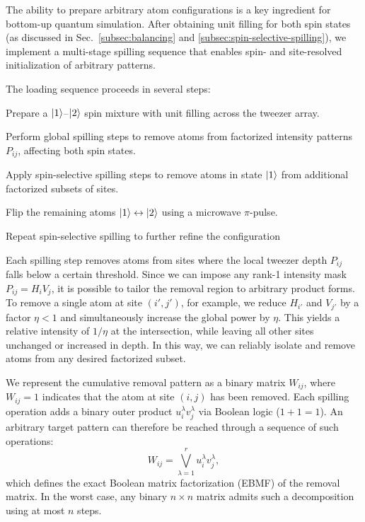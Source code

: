 
The ability to prepare arbitrary atom configurations is a key ingredient for bottom-up quantum simulation. After obtaining unit filling for both spin states (as discussed in Sec.~\ref{subsec:balancing} and \ref{subsec:spin-selective-spilling}), we implement a multi-stage spilling sequence that enables spin- and site-resolved initialization of arbitrary patterns.

The loading sequence proceeds in several steps:
\begin{enumerate*}
    \item Prepare a $\left| 1 \right\rangle$–$\left| 2 \right\rangle$ spin mixture with unit filling across the tweezer array.
    \item Perform global spilling steps to remove atoms from factorized intensity patterns $P_{ij}$, affecting both spin states.
    \item Apply spin-selective spilling steps to remove atoms in state $\left| 1 \right\rangle$ from additional factorized subsets of sites.
    \item Flip the remaining atoms $\left| 1 \right\rangle \leftrightarrow \left| 2 \right\rangle$ using a microwave $\pi$-pulse.
    \item Repeat spin-selective spilling to further refine the configuration
\end{enumerate*}

Each spilling step removes atoms from sites where the local tweezer depth $P_{ij}$ falls below a certain threshold. Since we can impose any rank-1 intensity mask $P_{ij} = H_i V_j$, it is possible to tailor the removal region to arbitrary product forms. To remove a single atom at site $(i', j')$, for example, we reduce $H_{i'}$ and $V_{j'}$ by a factor $\eta < 1$ and simultaneously increase the global power by $\eta$. This yields a relative intensity of $1/\eta$ at the intersection, while leaving all other sites unchanged or increased in depth. In this way, we can reliably isolate and remove atoms from any desired factorized subset.

We represent the cumulative removal pattern as a binary matrix $W_{ij}$, where $W_{ij} = 1$ indicates that the atom at site $(i, j)$ has been removed. Each spilling operation adds a binary outer product $u^\lambda_i v^\lambda_j$ via Boolean logic ($1 + 1 = 1$). An arbitrary target pattern can therefore be reached through a sequence of such operations:
\begin{equation}
    \label{eq:ebmf}
    W_{ij} = \bigvee_{\lambda=1}^{r} u^\lambda_i v^\lambda_j,
\end{equation}
which defines the exact Boolean matrix factorization (EBMF) of the removal matrix. In the worst case, any binary $n \times n$ matrix admits such a decomposition using at most $n$ steps.


